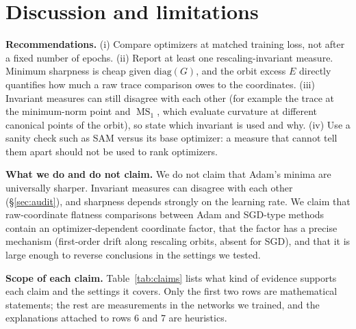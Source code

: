 \documentclass[10pt]{article}
\theoremstyle{remark}
\newcommand{\MS}{\operatorname{MS}}
\begin{document}
\section{Discussion and limitations}
\textbf{Recommendations.} (i) Compare optimizers at matched training loss, not after a fixed number of epochs. (ii) Report at least one rescaling-invariant measure. Minimum sharpness is cheap given $\mathrm{diag}(G)$, and the orbit excess $E$ directly quantifies how much a raw trace comparison owes to the coordinates. (iii) Invariant measures can still disagree with each other (for example the trace at the minimum-norm point and $\MS_1$, which evaluate curvature at different canonical points of the orbit), so state which invariant is used and why. (iv) Use a sanity check such as SAM versus its base optimizer: a measure that cannot tell them apart should not be used to rank optimizers.

\textbf{What we do and do not claim.} We do not claim that Adam's minima are universally sharper. Invariant measures can disagree with each other (\S\ref{sec:audit}), and sharpness depends strongly on the learning rate. We claim that raw-coordinate flatness comparisons between Adam and SGD-type methods contain an optimizer-dependent coordinate factor, that the factor has a precise mechanism (first-order drift along rescaling orbits, absent for SGD), and that it is large enough to reverse conclusions in the settings we tested.

\textbf{Scope of each claim.} Table~\ref{tab:claims} lists what kind of evidence supports each claim and the settings it covers. Only the first two rows are mathematical statements; the rest are measurements in the networks we trained, and the explanations attached to rows 6 and 7 are heuristics.
\end{document}
